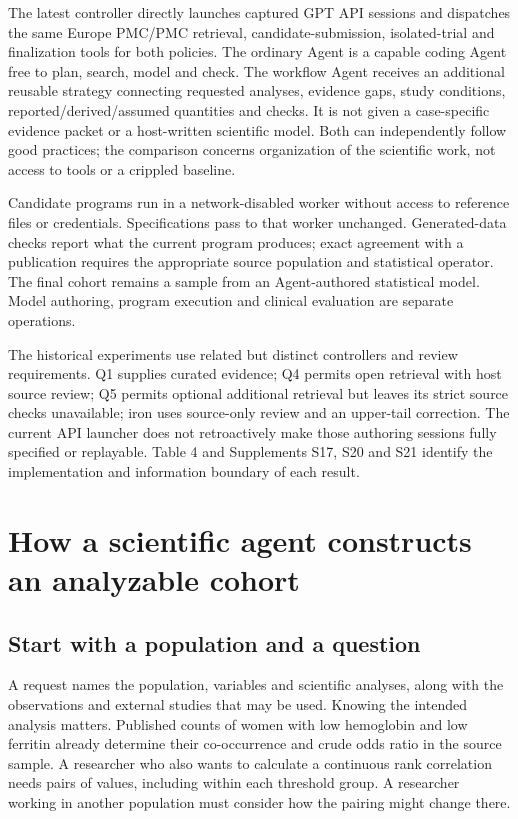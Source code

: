 \documentclass[11pt,letterpaper]{article}
\begin{document}
\endgroup

The latest controller directly launches captured GPT API sessions and dispatches the same Europe PMC/\allowbreak{}PMC retrieval, candidate-submission, isolated-trial and finalization tools for both policies. The ordinary Agent is a capable coding Agent free to plan, search, model and check. The workflow Agent receives an additional reusable strategy connecting requested analyses, evidence gaps, study conditions, reported/\allowbreak{}derived/\allowbreak{}assumed quantities and checks. It is not given a case-specific evidence packet or a host-written scientific model. Both can independently follow good practices; the comparison concerns organization of the scientific work, not access to tools or a crippled baseline.


Candidate programs run in a network-disabled worker without access to reference files or credentials. Specifications pass to that worker unchanged. Generated-data checks report what the current program produces; exact agreement with a publication requires the appropriate source population and statistical operator. The final cohort remains a sample from an Agent-authored statistical model. Model authoring, program execution and clinical evaluation are separate operations.


The historical experiments use related but distinct controllers and review requirements. Q1 supplies curated evidence; Q4 permits open retrieval with host source review; Q5 permits optional additional retrieval but leaves its strict source checks unavailable; iron uses source-only review and an upper-tail correction. The current API launcher does not retroactively make those authoring sessions fully specified or replayable. Table 4 and Supplements S17, S20 and S21 identify the implementation and information boundary of each result.


\section{How a scientific agent constructs an analyzable cohort}

\subsection{Start with a population and a question}

A request names the population, variables and scientific analyses, along with the observations and external studies that may be used. Knowing the intended analysis matters. Published counts of women with low hemoglobin and low ferritin already determine their co-occurrence and crude odds ratio in the source sample. A researcher who also wants to calculate a continuous rank correlation needs pairs of values, including within each threshold group. A researcher working in another population must consider how the pairing might change there.
\end{document}
